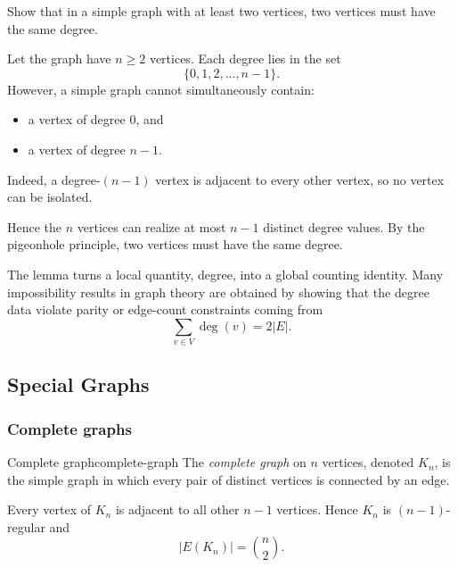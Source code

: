 \begin{examplebox}[title={Tutorial 7, Question 4}]
Show that in a simple graph with at least two vertices, two vertices must have the same degree.

Let the graph have \(n\ge 2\) vertices. Each degree lies in the set
\[
\{0,1,2,\dots,n-1\}.
\]
However, a simple graph cannot simultaneously contain:
\begin{itemize}[leftmargin=*]
    \item a vertex of degree \(0\), and
    \item a vertex of degree \(n-1\).
\end{itemize}
Indeed, a degree-\((n-1)\) vertex is adjacent to every other vertex, so no vertex can be isolated.

Hence the \(n\) vertices can realize at most \(n-1\) distinct degree values. By the pigeonhole principle, two vertices must have the same degree.
\end{examplebox}

\begin{extension}[title={Why the Handshaking Lemma is powerful}]
The lemma turns a local quantity, degree, into a global counting identity. Many impossibility results in graph theory are obtained by showing that the degree data violate parity or edge-count constraints coming from
\[
\sum_{v\in V}\deg(v)=2|E|.
\]
\end{extension}

\subsection{Special Graphs}

\subsubsection{Complete graphs}

\begin{definition}{Complete graph}{complete-graph}
The \emph{complete graph} on \(n\) vertices, denoted \(K_n\), is the simple graph in which every pair of distinct vertices is connected by an edge.
\end{definition}

Every vertex of \(K_n\) is adjacent to all other \(n-1\) vertices. Hence \(K_n\) is \((n-1)\)-regular and
\[
|E(K_n)|=\binom{n}{2}.
\]


